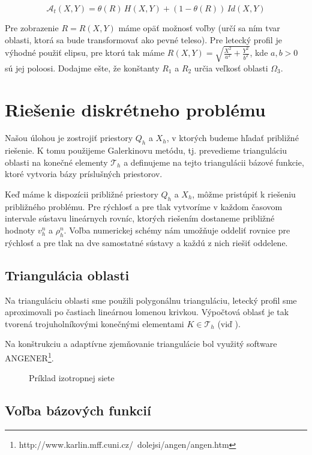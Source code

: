  $$\mathcal A_t(X,Y)=\theta(R)\,H(X,Y)+(1-\theta(R))\,Id(X,Y)$$
 
 Pre zobrazenie $R=R(X,Y)$ máme opäť možnosť voľby (určí sa ním tvar oblasti,
 ktorá sa bude transformovať ako pevné teleso). Pre letecký profil je výhodné
 použiť elipsu, pre ktorú tak máme 
 $R(X,Y)=\sqrt{\frac{X^2}{a^2}+\frac{Y^2}{b^2}}$, kde $a,b>0$ sú jej poloosi.
 Dodajme ešte, že konštanty $R_1$ a $R_2$ určia veľkosť oblasti $\Omega_3$.  
 
\chapter{Riešenie diskrétneho problému}

Našou úlohou je zostrojiť priestory $Q_h$ a $X_h$, v ktorých budeme hľadať
približné riešenie. K tomu použijeme Galerkinovu metódu, tj. prevedieme
trianguláciu oblasti na konečné elementy $\mathcal T_h$ a definujeme na tejto
triangulácii bázové funkcie, ktoré vytvoria bázy príslušných priestorov. 

Keď máme k dispozícii približné priestory $Q_h$ a $X_h$, môžme pristúpiť k
riešeniu približného problému. Pre rýchlosť a pre tlak vytvoríme v každom
časovom intervale sústavu lineárnych rovníc, ktorých riešením dostaneme
približné hodnoty $v_h^n$ a $\rho_h^n$. Voľba numerickej schémy
 nám umožňuje oddeliť rovnice pre rýchlosť a
pre tlak na dve samostatné sústavy a každú z nich riešiť oddelene.


\section{Triangulácia oblasti}

Na trianguláciu oblasti sme použili polygonálnu trianguláciu, letecký profil sme
aproximovali po častiach lineárnou lomenou krivkou. Výpočtová oblasť je tak
tvorená trojuholníkovými konečnými elementami $K\in\mathcal T_h$ (viď ).

Na konštrukciu a adaptívne zjemňovanie triangulácie bol využitý software
ANGENER\footnote{http://www.karlin.mff.cuni.cz/~dolejsi/angen/angen.htm}. 

\begin{figure}[h]
  \begin{center}
    \caption{Príklad izotropnej siete}
    \label{si-im-mesh}
  \end{center}
\end{figure}


\section{Voľba bázových funkcií}


